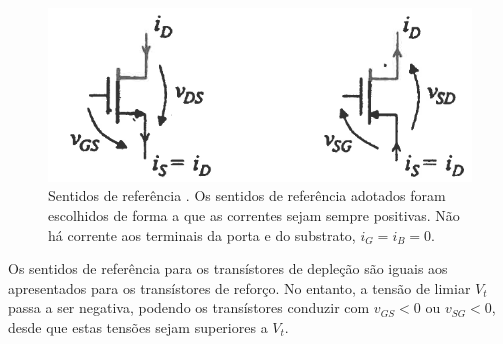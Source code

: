 \vspace{-0.75em}
\begin{figure}[H]
    \centering
    \includegraphics[width=0.55\linewidth]{img/3/MOSFET/MOS-sentidos.png}
    \caption{Sentidos de referência \cite{medeiros:CTBM}. Os sentidos de referência adotados foram escolhidos de forma a que as correntes sejam sempre positivas. Não há corrente aos terminais da porta e do substrato, $i_G = i_B = 0$.}
    \label{fig:MOS-sentidos}
\end{figure}

\vspace{-0.75em}
\noindent Os sentidos de referência para os transístores de depleção são iguais aos apresentados para os transístores de reforço. No entanto, a tensão de limiar $V_t$ passa a ser negativa, podendo os transístores conduzir com $v_{GS} < 0$ ou $v_{SG} < 0$, desde que estas tensões sejam superiores a $V_t$.

